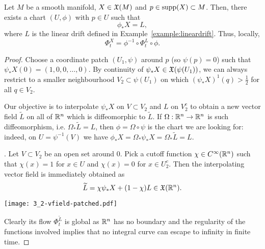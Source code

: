 \begin{theorem}
  Let $M$ be a smooth manifold, $X\in\mathfrak{X}(M)$ and $p\in\operatorname{supp}(X)\subset M$.
  Then, there exists a chart $(U, \phi)$ with $p\in U$ such that
  \begin{equation}
    \phi_* X = L,
  \end{equation}
  where $L$ is the linear drift defined in Example~\ref{example:lineardrift}.
  Thus, locally,
  \begin{equation}
    \Phi_t^X = \phi^{-1} \circ \Phi_t^L \circ \phi.
  \end{equation}
\end{theorem}
\begin{proof}
  Choose a coordinate patch $(U_1, \psi)$ around $p$ (so $\psi(p) = 0$) such that $\psi_* X(0) = (1,0,0,\ldots, 0)$.
  By continuity of $\psi_*X\in \mathfrak{X}(\psi(U_1))$, we can always restrict to a smaller neighbourhood $V_2\subset \psi(U_1)$ on which $(\psi_*X)^1(q) > \frac12$ for all $q\in V_2$.

  Our objective is to interpolate $\psi_* X$ on $V\subset V_2$ and $L$ on $V_2^c$ to obtain a new vector field $\widetilde{L}$ on all of $\mathbb{R}^n$ which is diffeomorphic to $\widetilde{L}$.
  If $\Omega:\mathbb{R}^n\to\mathbb{R}^n$ is such diffeomorphism, i.e. $\Omega_* \tilde  L = L$, then $\phi = \Omega\circ\psi$ is the chart we are looking for: indeed, on $U=\psi^{-1}(V)$ we have $\phi_* X = \Omega_*\psi_*X = \Omega_* \widetilde{L} = L$.

  . Let $V\subset V_2$ be an open set around $0$. Pick a cutoff function $\chi\in C^\infty(\mathbb{R}^n)$ such that $\chi(x) = 1$ for $x\in U$ and $\chi(x) =0$ for $x\in U_2^c$.
  Then the interpolating vector field is immediately obtained as
  \begin{equation}
    \widetilde{L} = \chi \psi_*X + (1-\chi)L \in \mathfrak{X}(\mathbb{R}^n).
  \end{equation}
  \begin{marginfigure}
    \texttt{[image: 3\_2-vfield-patched.pdf]}
  \end{marginfigure}
  Clearly its flow $\Phi_t^{\widetilde{L}}$ is global as $\mathbb{R}^n$ has no boundary and the regularity of the functions involved implies that no integral curve can escape to infinity in finite time.


\end{proof}
